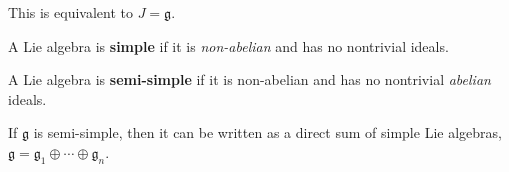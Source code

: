 This is equivalent to $J = \mathfrak{g}$.

\begin{definition}
    A Lie algebra is \textbf{simple} if it is \textit{non-abelian} and has no nontrivial ideals.
\end{definition}

\begin{definition}
    A Lie algebra is \textbf{semi-simple} if it is non-abelian and has no nontrivial \textit{abelian} ideals.
\end{definition}

\begin{proposition}
    If $\mathfrak{g}$ is semi-simple, then it can be written as a direct sum of simple Lie algebras, $\mathfrak{g} = \mathfrak{g}_1 \oplus \cdots \oplus \mathfrak{g}_n$.
\end{proposition}

